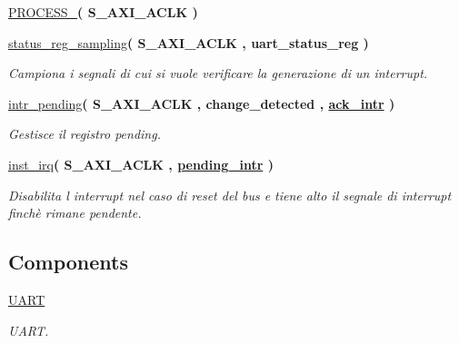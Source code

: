 \begin{DoxyCompactItemize}
\item 
\mbox{\label{classUART__v1__0__S00__AXI_1_1arch__imp_a6b83b9626c3e03102e58d7d89aad43eb}} 
\hyperlink{classUART__v1__0__S00__AXI_1_1arch__imp_a6b83b9626c3e03102e58d7d89aad43eb}{P\+R\+O\+C\+E\+S\+S\+\_}{\bfseries  ( {\bfseries \textcolor{vhdlchar}{S\+\_\+\+A\+X\+I\+\_\+\+A\+C\+LK}\textcolor{vhdlchar}{ }} )}
\item 
\hyperlink{classUART__v1__0__S00__AXI_1_1arch__imp_a1c2628d089a3915505bce1cba131c80a}{status\+\_\+reg\+\_\+sampling}{\bfseries  ( {\bfseries \textcolor{vhdlchar}{S\+\_\+\+A\+X\+I\+\_\+\+A\+C\+LK}\textcolor{vhdlchar}{ }} , {\bfseries \textcolor{vhdlchar}{uart\+\_\+status\+\_\+reg}\textcolor{vhdlchar}{ }} )}
\begin{DoxyCompactList}\small\item\em Campiona i segnali di cui si vuole verificare la generazione di un interrupt. \end{DoxyCompactList}\item 
\hyperlink{classUART__v1__0__S00__AXI_1_1arch__imp_a72db935ad9e80a3434cfb113c364c329}{intr\+\_\+pending}{\bfseries  ( {\bfseries \textcolor{vhdlchar}{S\+\_\+\+A\+X\+I\+\_\+\+A\+C\+LK}\textcolor{vhdlchar}{ }} , {\bfseries \textcolor{vhdlchar}{change\+\_\+detected}\textcolor{vhdlchar}{ }} , {\bfseries {\bfseries \hyperlink{classUART__v1__0__S00__AXI_1_1arch__imp_a65e0e54a6d565935dd24ce96dbbce53a}{ack\+\_\+intr}} \textcolor{vhdlchar}{ }} )}
\begin{DoxyCompactList}\small\item\em Gestisce il registro pending. \end{DoxyCompactList}\item 
\hyperlink{classUART__v1__0__S00__AXI_1_1arch__imp_a48d068c63e454a766cd9703aff942fb6}{inst\+\_\+irq}{\bfseries  ( {\bfseries \textcolor{vhdlchar}{S\+\_\+\+A\+X\+I\+\_\+\+A\+C\+LK}\textcolor{vhdlchar}{ }} , {\bfseries {\bfseries \hyperlink{classUART__v1__0__S00__AXI_1_1arch__imp_a5595ca2e548ef1d12b7fa2bac3e2aa00}{pending\+\_\+intr}} \textcolor{vhdlchar}{ }} )}
\begin{DoxyCompactList}\small\item\em Disabilita l\textquotesingle{} interrupt nel caso di reset del bus e tiene alto il segnale di interrupt finchè rimane pendente. \end{DoxyCompactList}\end{DoxyCompactItemize}
\subsection*{Components}
 \begin{DoxyCompactItemize}
\item 
\hyperlink{classUART__v1__0__S00__AXI_1_1arch__imp_a6f88b8988ee3bab3eaaa301212c7f804}{U\+A\+RT}  {\bfseries }  
\begin{DoxyCompactList}\small\item\em U\+A\+RT. \end{DoxyCompactList}\end{DoxyCompactItemize}
